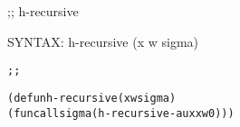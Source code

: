 \begin{aibox}{\function}
;; h-recursive

SYNTAX: h-recursive (x w sigma) 
\end{aibox}

\begin{aibox}{\examples}

\end{aibox}

\begin{aibox}{\comments}

\end{aibox}
\begin{aibox}{\answers}

\end{aibox}
\begin{aibox}{\othercomments}

\end{aibox}
\begin{aibox}{\pseudocode}

\end{aibox}
\begin{aibox}{\code}

\begin{alltt}
;;%% code

(defun h-recursive (x w sigma) 
        (funcall sigma (h-recursive-aux x w 0)))

\end{alltt}
\end{aibox}
